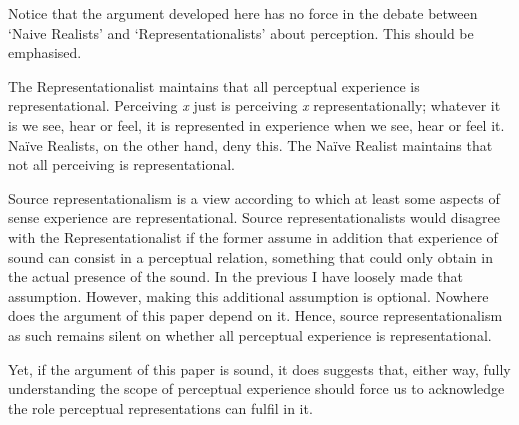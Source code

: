 \documentclass[sloppy, journal, git, bytitle, dodraft]{humapap}
\begin{document}
\sect Notice that the argument developed here has no force in the debate between `Naive Realists' and `Representationalists' about perception. This should be emphasised. 

The Representationalist maintains that all perceptual experience is representational. Perceiving \emph{x} just is perceiving \emph{x} representationally; whatever it is we see, hear or feel, it is represented in experience when we see, hear or feel it. Naïve Realists, on the other hand, deny this. The Naïve Realist maintains that not all perceiving is representational.

Source representationalism is a view according to which at least some aspects of sense experience are representational. Source representationalists would disagree with the Representationalist if the former assume in addition that experience of sound can consist in a perceptual relation, something that could only obtain in the actual presence of the sound. In the previous I have loosely made that assumption. However, making this additional assumption is optional. Nowhere does the argument of this paper depend on it. Hence, source representationalism as such remains silent on whether all perceptual experience is representational.

Yet, if the argument of this paper is sound, it does suggests that, either way, fully understanding the scope of perceptual experience should force us to acknowledge the role perceptual representations can fulfil in it.





% 
% 
% 


\printbibliography
\end{document}

